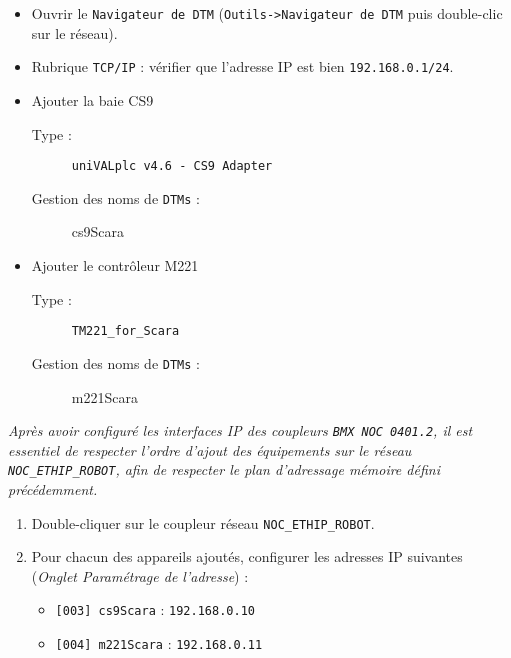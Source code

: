 \begin{UPSTIConfiguration}
    \begin{itemize}
        \item Ouvrir le \texttt{Navigateur de DTM} (\texttt{Outils->Navigateur de DTM} puis double-clic sur le réseau).
        \item Rubrique \texttt{TCP/IP} : vérifier que l'adresse IP est bien \texttt{192.168.0.1/24}.
        \end{itemize}
    \begin{itemize}
        \item Ajouter la baie CS9 
        \begin{description}
            \item [Type :] \texttt{uniVALplc v4.6 - CS9 Adapter}
            \item [Gestion des noms de \texttt{DTMs} :] cs9Scara
        \end{description}
        \item Ajouter le contrôleur M221
        \begin{description}
            \item [Type :] \texttt{TM221\_for\_Scara}
            \item [Gestion des noms de \texttt{DTMs} :] m221Scara
        \end{description}
    \end{itemize}
    \textit{Après avoir configuré les interfaces IP des coupleurs \texttt{BMX NOC 0401.2}, il est essentiel de respecter l'ordre d'ajout des équipements sur le réseau \texttt{NOC\_ETHIP\_ROBOT}, afin de respecter le plan d'adressage mémoire défini précédemment. }
\end{UPSTIConfiguration}
\pagebreak
\begin{UPSTIConfiguration}
    \begin{enumerate}
        \item Double-cliquer sur le coupleur réseau \texttt{NOC\_ETHIP\_ROBOT}.
        \item Pour chacun des appareils ajoutés, configurer les adresses IP suivantes (\textit{Onglet Paramétrage de l'adresse}) :
        \begin{itemize}
            \item \texttt{[003] cs9Scara} : \texttt{192.168.0.10}
            \item \texttt{[004] m221Scara} : \texttt{192.168.0.11}
        \end{itemize}
    \end{enumerate}
\end{UPSTIConfiguration}

